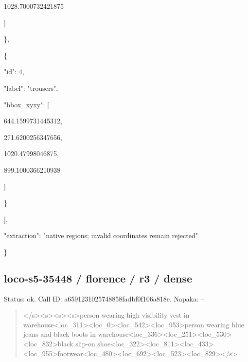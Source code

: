 \documentclass[10pt,a4paper]{article}
\begin{document}
        1028.7000732421875\par
      ]\par
    \},\allowbreak{}\par
    \{\par
      "id":\allowbreak{} 4,\allowbreak{}\par
      "label":\allowbreak{} "trousers",\allowbreak{}\par
      "bbox\_xyxy":\allowbreak{} [\par
        644.1599731445312,\allowbreak{}\par
        271.6200256347656,\allowbreak{}\par
        1020.47998046875,\allowbreak{}\par
        899.1000366210938\par
      ]\par
    \}\par
  ],\allowbreak{}\par
  "extraction":\allowbreak{} "native regions; invalid coordinates remain rejected"\par
\}
\subsection*{loco-s5-35448 / florence / r3 / dense}
Status: ok. Call ID: a6591231025748858fadbf0f106a818e. Napaka: --
\begin{quote}\footnotesize
</s>\allowbreak{}<s>\allowbreak{}<s>\allowbreak{}<s>\allowbreak{}person wearing high visibility vest in warehouse<loc\_311>\allowbreak{}<loc\_0>\allowbreak{}<loc\_54\allowbreak{}2>\allowbreak{}<loc\_953>\allowbreak{}person wearing blue jeans and black boots in warehouse<loc\_336>\allowbreak{}<loc\_251>\allowbreak{}<loc\_\allowbreak{}530>\allowbreak{}<loc\_832>\allowbreak{}black slip-on shoe<loc\_322>\allowbreak{}<loc\_811>\allowbreak{}<loc\_433>\allowbreak{}<\allowbreak{}loc\_955>\allowbreak{}footwear<loc\_480>\allowbreak{}<loc\_69\allowbreak{}2>\allowbreak{}<loc\_523>\allowbreak{}<loc\_829>\allowbreak{}</s>\allowbreak{}
\end{quote}
\end{document}
